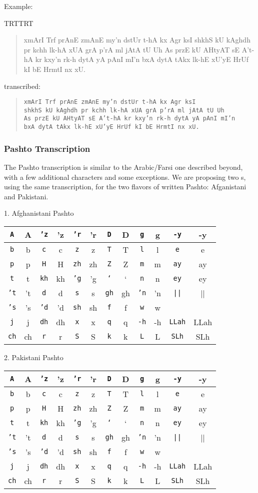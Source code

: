 \documentclass[a4paper,11pt]{article}
\def\shortpashto#1{{\pushocplist\AfghaPashtoOCP\fontfamily{omarb}\selectfont#1\popocplist}}
\def\shortpashtop#1{{\pushocplist\PakiPashtoOCP\fontfamily{omarb}\selectfont#1\popocplist}}
\def\patl#1#2#3#4#5#6{\hline\rule[-5pt]{0pt}{14pt}\texttt{#1}&\shortpashto{#1}&\texttt{#2}&\shortpashto{#2}&\texttt{#3}&\shortpashto{#3}&
\texttt{#4}&\shortpashto{#4}&\texttt{#5}&\shortpashto{#5}&\texttt{#6}&\shortpashto{#6}\\}
\def\paptl#1#2#3#4#5#6{\hline\rule[-5pt]{0pt}{14pt}\texttt{#1}&\shortpashtop{#1}&\texttt{#2}&\shortpashtop{#2}&\texttt{#3}&\shortpashtop{#3}&
\texttt{#4}&\shortpashtop{#4}&\texttt{#5}&\shortpashtop{#5}&\texttt{#6}&\shortpashtop{#6}\\}
\begin{document}
\noindent
Example: 

{\pardir TRT\textdir TRT
\begin{quote}
\pushocplist\UrduOCP{}\selectfont xmArI Trf prAnE
zmAnE my'n dstUr t-hA kx Agr ksI shkhS kU kAghdh pr kchh lk-hA xUA grA
p'rA ml jAtA tU Uh As przE kU AHtyAT sE A't-hA kr kxy'n rk-h dytA yA
pAnI mI'n bxA dytA tAkx lk-hE xU'yE HrUf kI bE HrmtI nx xU.
\popocplist
\end{quote}}

\noindent
transcribed: 

\begin{quote}
\texttt{xmArI Trf prAnE zmAnE my'n dstUr t-hA kx Agr ksI\\
shkhS kU kAghdh pr kchh lk-hA xUA grA p'rA ml jAtA tU Uh\\
As przE kU AHtyAT sE A't-hA kr kxy'n rk-h dytA yA pAnI mI'n\\
bxA dytA tAkx lk-hE xU'yE HrUf kI bE HrmtI nx xU.}
\end{quote}

\subsubsection{Pashto Transcription}

The Pashto transcription is similar to the Arabic/Farsi one described
beyond, with a few additional characters and some exceptions. We are
proposing two \OTP{}s, using the same transcription, for the two
flavors of written Pashto: Afganistani and Pakistani.

1. Afghanistani Pashto

\begin{center}
\begin{tabular}{|c|c||c|c||c|c||c|c||c|c||c|c|}
\patl{A}{'z}{'r}{D}{g}{-y}
\patl{b}{c}{z}{T}{l}{e}
\patl{p}{H}{zh}{Z}{m}{ay}
\patl{t}{kh}{'g}{`}{n}{ey}
\patl{'t}{d}{s}{gh}{'n}{||}
\patl{'s}{'d}{sh}{f}{w}{}
\patl{j}{dh}{x}{q}{-h}{LLah}
\patl{ch}{r}{S}{k}{L}{SLh}
\hline
\end{tabular}
\end{center}

2. Pakistani Pashto

\begin{center}
\begin{tabular}{|c|c||c|c||c|c||c|c||c|c||c|c|}
\paptl{A}{'z}{'r}{D}{g}{-y}
\paptl{b}{c}{z}{T}{l}{e}
\paptl{p}{H}{zh}{Z}{m}{ay}
\paptl{t}{kh}{'g}{`}{n}{ey}
\paptl{'t}{d}{s}{gh}{'n}{||}
\paptl{'s}{'d}{sh}{f}{w}{}
\paptl{j}{dh}{x}{q}{-h}{LLah}
\paptl{ch}{r}{S}{k}{L}{SLh}
\hline
\end{tabular}
\end{center}
\end{document}
